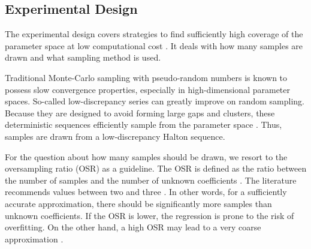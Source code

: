 \subsection{Experimental Design}
\label{sec:sampling}



The experimental design covers strategies to find sufficiently high coverage
of the parameter space at low computational cost \cite{fajraoui_optimal_2017,usher_value_2015}.
It deals with how many samples are drawn and what sampling method is used.


Traditional Monte-Carlo sampling with pseudo-random numbers is known to
possess slow convergence properties, %
especially in high-dimensional parameter spaces.
So-called low-discrepancy series can greatly improve on random sampling.
Because they are designed to avoid forming large gaps and clusters,
these deterministic sequences efficiently sample from the parameter space \cite{fajraoui_optimal_2017}.
Thus, samples are drawn from a low-discrepancy Halton sequence.


For the question about how many samples should be drawn,
we resort to the oversampling ratio (OSR) as a guideline.
The OSR is defined as the ratio between the number of samples
and the number of unknown coefficients \cite{palar_multi-fidelity_2016}.
The literature recommends values between two and three \cite{hosder2007,palar_multi-fidelity_2016,fajraoui_optimal_2017,gratiet_metamodel-based_2015}.
In other words, for a sufficiently accurate approximation,
there should be significantly more samples than unknown coefficients.
If the OSR is lower, the regression is prone to the risk of overfitting.
On the other hand, a high OSR may lead to a very coarse approximation \cite{palar_multi-fidelity_2016}.

